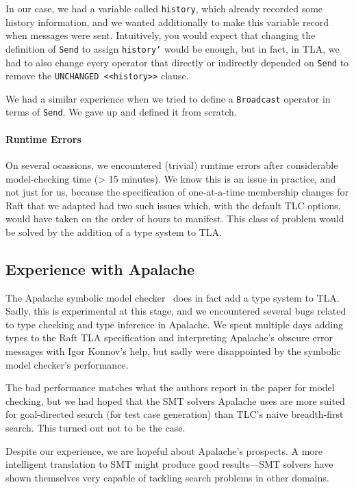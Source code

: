 \documentclass[a4paper]{article}
\begin{document}
In our case, we had a variable called \texttt{history}, which already recorded some history information, and we wanted additionally to make this variable record when messages were sent.
%
Intuitively, you would expect that changing the definition of \texttt{Send} to assign \texttt{history'} would be enough, but in fact, in TLA, we had to also change every operator that directly or indirectly depended on \texttt{Send} to remove the \texttt{UNCHANGED <<history>>} clause.

We had a similar experience when we tried to define a \texttt{Broadcast} operator in terms of \texttt{Send}.
%
We gave up and defined it from scratch.

\paragraph{Runtime Errors}
%
On several ocassions, we encountered (trivial) runtime errors after considerable model-checking time (> 15 minutes).
%
We know this is an issue in practice, and not just for us, because the specification of one-at-a-time membership changes for Raft that we adapted had two such issues which, with the default TLC options, would have taken on the order of hours to manifest.
%
This class of problem would be solved by the addition of a type system to TLA.

\subsection{Experience with Apalache}

The Apalache symbolic model checker~\cite{konnov_tla+_2019} does in fact add a type system to TLA.
%
Sadly, this is experimental at this stage, and we encountered several bugs related to type checking and type inference in Apalache.
%
We spent multiple days adding types to the Raft TLA specification and interpreting Apalache's obscure error messages with Igor Konnov's help, but sadly were disappointed by the symbolic model checker's performance.

The bad performance matches what the authors report in the paper for model checking, but we had hoped that the SMT solvers Apalache uses are more suited for goal-directed search (for test case generation) than TLC's naive breadth-first search.
%
This turned out not to be the case.

Despite our experience, we are hopeful about Apalache's prospects.
%
A more intelligent translation to SMT might produce good results---SMT solvers have shown themselves very capable of tackling search problems in other domains.
\end{document}
